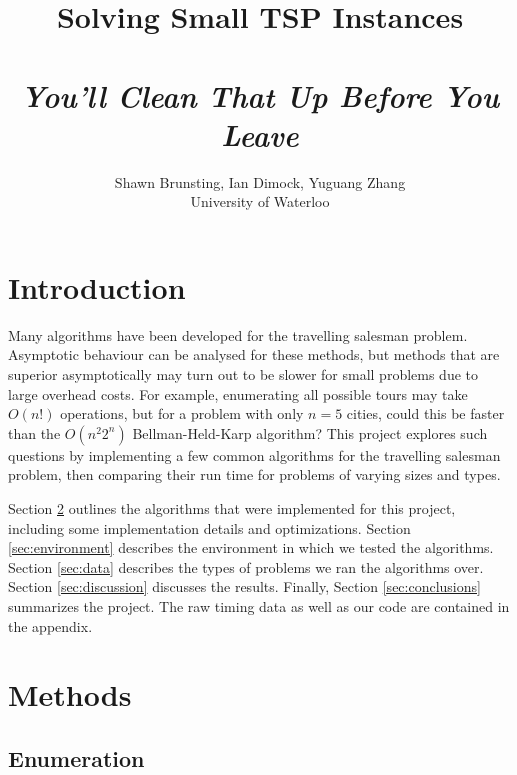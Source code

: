 \documentclass[11pt]{article}
\begin{document}
\thispagestyle{empty}

\title{Solving Small TSP Instances \\ ~ \\ \textit{You'll Clean That Up Before You Leave}}

\author{Shawn Brunsting, Ian Dimock, Yuguang Zhang \\ University of Waterloo}

\maketitle


\section{Introduction}

Many algorithms have been developed for the travelling salesman problem. Asymptotic behaviour can be analysed for these methods, but methods that are superior asymptotically may turn out to be slower for small problems due to large overhead costs. For example, enumerating all possible tours may take $O(n!)$ operations, but for a problem with only $n=5$ cities, could this be faster than the $O(n^2 2^n)$ Bellman-Held-Karp algorithm? This project explores such questions by implementing a few common algorithms for the travelling salesman problem, then comparing their run time for problems of varying sizes and types.

Section \ref{sec:methods} outlines the algorithms that were implemented for this project, including some implementation details and optimizations. Section \ref{sec:environment} describes the environment in which we tested the algorithms. Section \ref{sec:data} describes the types of problems we ran the algorithms over. Section \ref{sec:discussion} discusses the results. Finally, Section \ref{sec:conclusions} summarizes the project. The raw timing data as well as our code are contained in the appendix.

\section{Methods}
\label{sec:methods}

\subsection{Enumeration}
\end{document}
